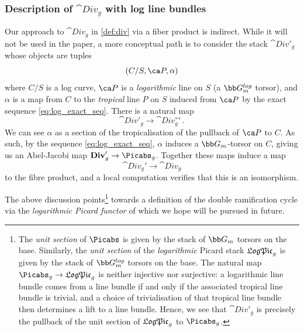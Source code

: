 

\subsubsection{Description of \texorpdfstring{$\cat{Div}_g$}{Div\_g} with log line bundles}
Our approach to $\cat{Div}_g$ in \cref{def:div} via
a fiber product is indirect.
While it will not be used in the paper, a more conceptual path is to consider the stack $\cat{Div}'_g$ whose objects are tuples
\begin{equation*}
(C/S, \ca P, \alpha)
\end{equation*}
where $C/S$ is a log curve, $\ca P$ is a \emph{logarithmic} line on $S$  (a $\bb G_m^{log}$ torsor), and $\alpha$ is a map from $C$ to the \emph{tropical} line $P$ on $S$ induced from $\ca P$ by the exact sequence \eqref{eq:log_exact_seq}.
There is a natural map
$$\cat{Div}'_g \to \cat{Div}^{\rel}_g\, .$$ We can see $\alpha$ as a section of the tropicalisation of the pullback of $\ca P$ to $C$. As such, by the sequence \eqref{eq:log_exact_seq}, $\alpha$ induces a $\bb G_m$-torsor on $C$, giving us an Abel-Jacobi map $\cat{Div}_g'\to \Picabs_g$. Together these maps induce a map
\begin{equation*}
\cat{Div}_g' \to \cat{Div}_g
\end{equation*}
to the fibre product, and a local computation verifies that this is an isomorphism.

 The above discussion points\footnote{The {\it unit section} of $\Picabs$ is given by the stack of $\bb G_m$ torsors on the base. Similarly, the {\it unit section} of the \emph{logarithmic} Picard stack $\frak{LogPic}_g$ is given by the stack of $\bb G_m^{log}$ torsors on the base. The natural map $\Picabs_g \to \frak{LogPic}_g$ is neither injective nor surjective: a logarithmic line bundle comes from a line bundle if and only if the associated tropical line bundle is trivial, and a choice of trivialisation of that tropical line bundle then determines a lift to a line bundle. Hence, we see that $\cat{Div}'_g$ is precisely the pullback of the unit section of $\frak{LogPic}_g$ to $\Picabs_g$.} towards a definition of the double ramification cycle via the \emph{logarithmic Picard functor} of \cite{Molcho2018The-logarithmic}
which we hope will be pursued in future.


